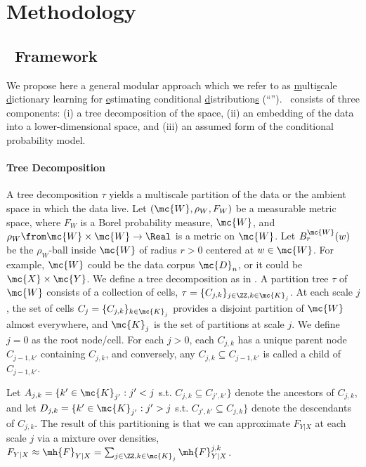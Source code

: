 \section{Methodology} \label{sec:method}

\subsection{\msd~Framework} \label{sub:method}

We propose here a general modular approach which we refer to as \uline{m}ulti\uline{s}cale \uline{d}ictionary learning for \uline{e}stimating conditional \uline{d}istribution\uline{s} (``\msd''). \msd~consists of three components: (i) a tree decomposition of the space, (ii) an embedding of the data into a lower-dimensional space,  and (iii) an assumed form of the conditional probability model. 

\paragraph{Tree Decomposition}
A tree decomposition $\tau$ yields a multiscale partition of the data or the ambient space in which the data live.
Let $(\mc{W},\rho_W, F_W)$ be a measurable metric space, where $F_W$ is a Borel probability measure, $\mc{W}$, and $\rho_W \from \mc{W} \times \mc{W} \to \Real$ is a metric on $\mc{W}$.  Let $B_r^{\mc{W}}(w)$ be the $\rho_W$-ball inside $\mc{W}$ of radius $r > 0$ centered at $w \in \mc{W}$. For example, $\mc{W}$ could be the data corpus $\mc{D}_n$, or it could be $\mc{X} \times \mc{Y}$. We define a tree decomposition as in \cite{Allard2012,ChenMaggioni12}.  A partition tree $\tau$ of $\mc{W}$ consists of a collection of cells, $\tau=\{C_{j,k}\}_{j \in \ZZ, k \in \mc{K}_j}$.  At each scale $j$, the set of cells $C_j=\{C_{j,k}\}_{k \in \mc{K}_j}$ provides a disjoint partition of $\mc{W}$ almost everywhere, and $\mc{K}_j$ is the set of partitions at scale $j$.  We define $j=0$ as the root node/cell.  For each $j > 0$,  each $C_{j,k}$ has a unique parent node $C_{j-1,k'}$ containing $C_{j,k}$, and conversely, any $C_{j,k} \subseteq C_{j-1,k'}$ is called a child of $C_{j-1,k'}$.


Let $A_{j,k}=\{k' \in \mc{K}_{j'} : j' < j$ s.t. $C_{j,k} \subseteq C_{j',k'}\}$ denote the ancestors of $C_{j,k}$, and let $D_{j,k}=\{k' \in \mc{K}_{j'} : j' > j$ s.t. $C_{j',k'} \subseteq C_{j,k}\}$ denote the descendants of $C_{j,k}$.
The result of this partitioning is that we can approximate $F_{Y|X}$ at each scale $j$ via a mixture over densities, $F_{Y|X} \approx \mh{F}_{Y|X}= \sum_{j \in \ZZ, k \in \mc{K}_j} \mh{F}^{j,k}_{Y|X}$. 


